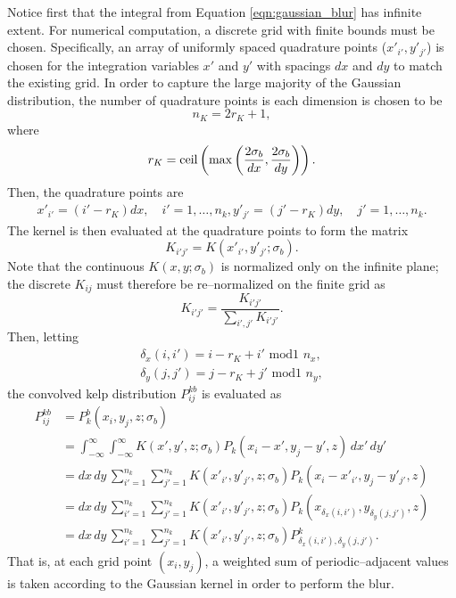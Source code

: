 Notice first that the integral from Equation \eqref{eqn:gaussian_blur} has infinite extent.
For numerical computation, a discrete grid with finite bounds must be chosen.
Specifically, an array of uniformly spaced quadrature points ($x'_{i'}, y'_{j'}$) is chosen for the integration variables $x'$ and $y'$ with spacings $dx$ and $dy$ to match the existing grid.
In order to capture the large majority of the Gaussian distribution, the number of quadrature points is each dimension is chosen to be
\begin{equation}
  n_K = 2r_K+1,
\end{equation}
where
\begin{equation}
  r_K = \mbox{ceil}\left(\max\left(\frac{2\sigma_b}{dx}, \frac{2\sigma_b}{dy}\right)\right).
\end{equation}
Then, the quadrature points are
\begin{align*}
  x'_{i'} = (i'-r_K)dx, \quad i'=1,\ldots,n_k,
  y'_{j'} = (j'-r_K)dy, \quad j'=1,\ldots,n_k.
\end{align*}
The kernel is then evaluated at the quadrature points to form the matrix
\begin{equation*}
  K_{i'j'} = K\left(x'_{i'}, y'_{j'}; \sigma_b\right).
\end{equation*}
Note that the continuous $K(x, y; \sigma_b)$ is normalized only on the infinite plane;
the discrete $K_{ij}$ must therefore be re--normalized on the finite grid as
\begin{equation*}
  K_{i'j'} = \frac{K_{i'j'}}{\sum_{i',j'} K_{i'j'}}.
\end{equation*}
Then, letting
\begin{align*}
  \delta_x(i, i') = i - r_K + i'\mbox{ mod1 }n_x, \\
  \delta_y(j, j') = j - r_K + j'\mbox{ mod1 }n_y,
\end{align*}
the convolved kelp distribution $P_{ij}^{kb}$ is evaluated as
\begin{align*}
  P_{ij}^{kb} &= P_k^b(x_i, y_j, z; \sigma_b) \\
  &= \int_{-\infty}^{\infty} \int_{-\infty}^{\infty} K(x', y', z; \sigma_b) P_k(x_i-x', y_j-y', z)\, dx'\, dy' \\
  &= dx\, dy\, \sum_{i'=1}^{n_k} \sum_{j'=1}^{n_k} K\left(x'_{i'}, y'_{j'}, z; \sigma_b\right) P_k\left(x_i-x'_{i'}, y_j-y'_{j'}, z\right) \\
  &= dx\, dy\, \sum_{i'=1}^{n_k} \sum_{j'=1}^{n_k} K\left(x'_{i'}, y'_{j'}, z; \sigma_b\right) P_k\left(x_{\delta_x(i,i')}, y_{\delta_y(j,j')}, z\right) \\
  &= dx\, dy\, \sum_{i'=1}^{n_k} \sum_{j'=1}^{n_k} K\left(x'_{i'}, y'_{j'}, z; \sigma_b\right) P_{\delta_x(i,i'), \delta_y(j,j')}^k.
\end{align*}
That is, at each grid point $(x_i, y_j)$, a weighted sum of periodic--adjacent values is taken according to the Gaussian kernel in order to perform the blur.



